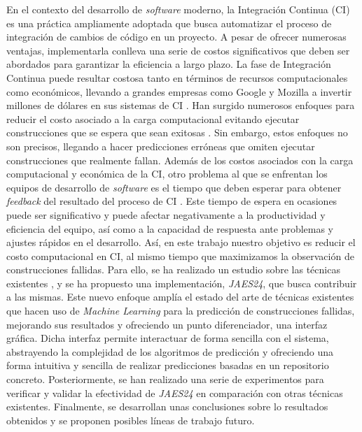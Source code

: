 En el contexto del desarrollo de \textit{software} moderno, la Integración Continua (CI) es
una práctica ampliamente adoptada que busca automatizar el proceso de integración de cambios de
código en un proyecto. A pesar de ofrecer numerosas ventajas, implementarla conlleva una serie de
costos significativos que deben ser abordados para garantizar la eficiencia a largo plazo. La fase
de Integración Continua puede resultar costosa tanto en términos de recursos computacionales como
económicos, llevando a grandes empresas como Google y Mozilla a invertir millones de dólares en
sus sistemas de CI \cite{1}. Han surgido numerosos enfoques para reducir el costo asociado
a la carga computacional evitando ejecutar construcciones que se espera que sean exitosas
\cite{2}. Sin embargo, estos enfoques no son precisos, llegando a  hacer predicciones erróneas que
omiten ejecutar construcciones que realmente fallan. Además de los costos asociados con la carga
computacional y económica de la CI, otro problema al que se enfrentan los equipos de
desarrollo de \textit{software} es el tiempo que deben esperar para obtener \textit{feedback} del
resultado del proceso de CI \cite{3}. Este tiempo de espera en ocasiones puede ser
significativo y puede afectar negativamente a la productividad y eficiencia del equipo, así como
a la capacidad de respuesta ante problemas y ajustes rápidos en el desarrollo. Así, en este
trabajo nuestro objetivo es reducir el costo computacional en CI, al mismo tiempo que
maximizamos la observación de construcciones fallidas. Para ello, se ha realizado un estudio
sobre las técnicas existentes \cite{2,4,5,6,7,8}, y se ha propuesto una implementación,
\textit{JAES24}, que busca contribuir a las mismas. Este nuevo enfoque amplía el estado del arte
de técnicas existentes que hacen uso de \textit{Machine Learning} para la predicción de construcciones
fallidas, mejorando sus resultados y ofreciendo un punto diferenciador, una interfaz gráfica. Dicha
interfaz permite interactuar de forma sencilla con el sistema, abstrayendo la complejidad de los
algoritmos de predicción y ofreciendo una forma intuitiva y sencilla de realizar predicciones basadas
en un repositorio concreto. Posteriormente, se han realizado una serie de experimentos para verificar
y validar la efectividad de \textit{JAES24} en comparación con otras técnicas existentes. Finalmente,
se desarrollan unas conclusiones sobre lo resultados obtenidos y se proponen posibles líneas de
trabajo futuro.

\vspace{0.5cm}

